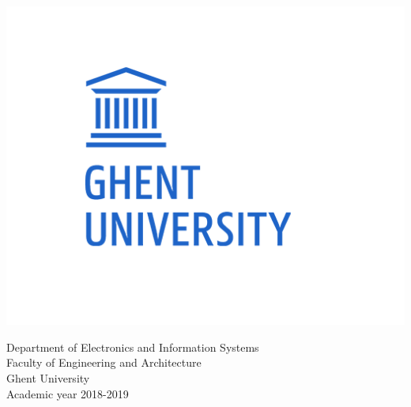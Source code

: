 \hspace{-0.7cm}
\begin{minipage}{0.3\textwidth}
  \begin{flushleft}
    \includegraphics[width=\textwidth]{./figures/logo-ugent}
  \end{flushleft}
\end{minipage}
\hspace{-\parindent}\begin{minipage}{0.7\textwidth}
\begin{flushright}
  \hspace{-\parindent}Department of Electronics and Information Systems\\
  \hspace{-\parindent}Faculty of Engineering and Architecture\\
  \hspace{-\parindent}Ghent University\\
  \hspace{-\parindent}Academic year 2018-2019
  \end{flushright}
\end{minipage}


